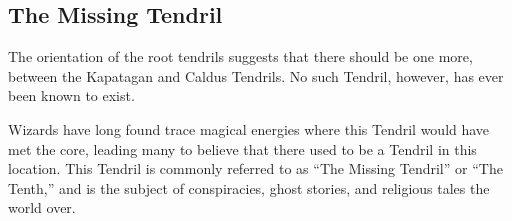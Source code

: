 \begin{multicols}{2}
\section{The Missing Tendril}
 The orientation of the root tendrils suggests that there should be one more, between the Kapatagan and Caldus Tendrils.
No such Tendril, however, has ever been known to exist.

Wizards have long found trace magical energies where this Tendril would have met the core, leading many to believe that there used to be a Tendril in this location.
This Tendril is commonly referred to as ``The Missing Tendril'' or ``The Tenth,'' and is the subject of conspiracies, ghost stories, and religious tales the world over.

\end{multicols}
